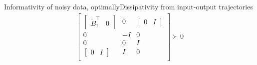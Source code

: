 \documentclass[aspectratio=169, handout, 10pt, hyperref=colorlinks]{beamer}
\begin{document}
\begin{frame}[allowframebreaks]{Informativity of noisy data, optimally}{Dissipativity from input-output trajectories}
{\begin{align}
\begin{bmatrix}
        \begin{bmatrix} \widetilde{B}_1^\top & 0 \end{bmatrix} & 0 & \begin{bmatrix} 0 & I \end{bmatrix} \\ 
        0 & -I & 0 \\
        0 & 0 & I \\ 
        \begin{bmatrix} 0&I \end{bmatrix} & I & 0 \\
        \end{bmatrix}
        \succ0
        \end{align}
        }
        \ethe



\end{frame}
\end{document}
